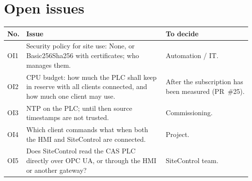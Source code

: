 \documentclass[11pt,a4paper]{article}
\begin{document}
\section{Open issues}
\label{sec:open}
\begin{small}
\begin{longtable}{@{}P{10mm}P{86mm}P{58mm}@{}}
\toprule
No. & Issue & To decide\\
\midrule
\endhead
\bottomrule
\endfoot
OI1 & Security policy for site use: None, or Basic256Sha256 with certificates; who manages them. &
Automation / IT.\\
OI2 & CPU budget: how much the PLC shall keep in reserve with all clients connected, and how much one
client may use. & After the subscription has been measured (PR~\#25).\\
OI3 & NTP on the PLC; until then source timestamps are not trusted. & Commissioning.\\
OI4 & Which client commands what when both the HMI and SiteControl are connected. & Project.\\
OI5 & Does SiteControl read the CAS PLC directly over OPC UA, or through the HMI or another gateway? &
SiteControl team.\\
\end{longtable}
\end{small}
\end{document}
